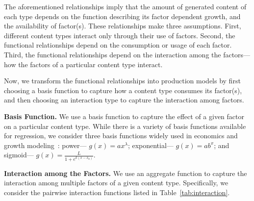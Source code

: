 The aforementioned relationships imply that the amount of generated content of each type depends on the function describing its factor dependent growth, and the availability of factor(s). These relationships make three assumptions. First, different content types interact only through their use of factors. Second, the functional relationships depend on the consumption or usage of each factor. Third, the functional relationships depend on the interaction among the factors---how the factors of a particular content type interact. 

Now, we transform the functional relationships into production models by first choosing a basis function to capture how a content type consumes its factor(s), and then choosing an interaction type to capture the interaction among factors.

\textbf{Basis Function.} We use a basis function to capture the effect of a given factor on a particular content type. While there is a variety of basis functions available for regression, we consider three basis functions widely used in economics and growth modeling~\cite{fekedulegn1999}: power--- $g(x) = ax^{\lambda}$; exponential--- $g(x) = ab^x$; and sigmoid--- $g(x) = \frac{L}{1+e^{k(x-x_0)}}$. 

\textbf{Interaction among the Factors.} We use an aggregate function to capture the interaction among multiple factors of a given content type. Specifically, we consider the pairwise interaction functions listed in Table~\ref{tab:interaction}. 

